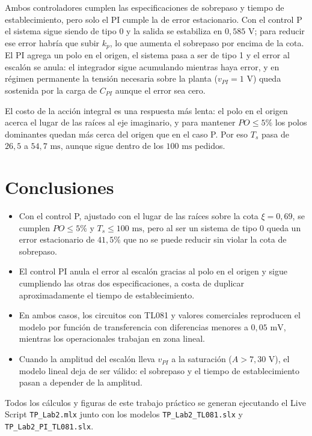 \documentclass[11pt,a4paper]{article}
\begin{document}
Ambos controladores cumplen las especificaciones de sobrepaso y tiempo de establecimiento, pero solo el PI cumple la de error estacionario. Con el control P el sistema sigue siendo de tipo 0 y la salida se estabiliza en $0{,}585\text{ V}$; para reducir ese error habría que subir $k_p$, lo que aumenta el sobrepaso por encima de la cota. El PI agrega un polo en el origen, el sistema pasa a ser de tipo 1 y el error al escalón se anula: el integrador sigue acumulando mientras haya error, y en régimen permanente la tensión necesaria sobre la planta ($v_{PI} = 1\text{ V}$) queda sostenida por la carga de $C_{PI}$ aunque el error sea cero.

El costo de la acción integral es una respuesta más lenta: el polo en el origen acerca el lugar de las raíces al eje imaginario, y para mantener $PO \le 5\%$ los polos dominantes quedan más cerca del origen que en el caso P. Por eso $T_s$ pasa de $26{,}5$ a $54{,}7\text{ ms}$, aunque sigue dentro de los $100\text{ ms}$ pedidos.

\section*{Conclusiones}

\begin{itemize}
    \item Con el control P, ajustado con el lugar de las raíces sobre la cota $\xi = 0{,}69$, se cumplen $PO \le 5\%$ y $T_s \le 100\text{ ms}$, pero al ser un sistema de tipo 0 queda un error estacionario de $41{,}5\%$ que no se puede reducir sin violar la cota de sobrepaso.
    \item El control PI anula el error al escalón gracias al polo en el origen y sigue cumpliendo las otras dos especificaciones, a costa de duplicar aproximadamente el tiempo de establecimiento.
    \item En ambos casos, los circuitos con TL081 y valores comerciales reproducen el modelo por función de transferencia con diferencias menores a $0{,}05\text{ mV}$, mientras los operacionales trabajan en zona lineal.
    \item Cuando la amplitud del escalón lleva $v_{PI}$ a la saturación ($A > 7{,}30\text{ V}$), el modelo lineal deja de ser válido: el sobrepaso y el tiempo de establecimiento pasan a depender de la amplitud.
\end{itemize}

Todos los cálculos y figuras de este trabajo práctico se generan ejecutando el Live Script \texttt{TP\_Lab2.mlx} junto con los modelos \texttt{TP\_Lab2\_TL081.slx} y \texttt{TP\_Lab2\_PI\_TL081.slx}.
\end{document}
